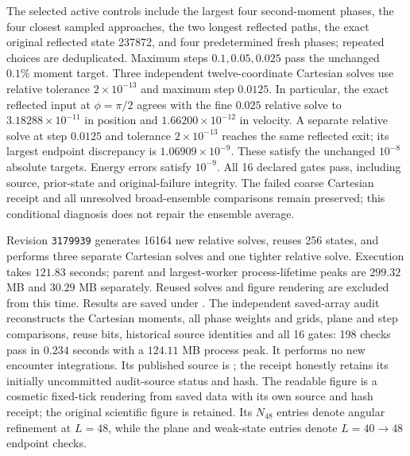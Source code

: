 \documentclass[11pt,letterpaper]{article}
\begin{document}
The selected active controls include the largest four second-moment
phases, the four closest sampled approaches, the two longest reflected
paths, the exact original reflected state 237872, and four predetermined
fresh phases; repeated choices are deduplicated. Maximum steps
$0.1,0.05,0.025$ pass the unchanged $0.1\%$ moment target.
Three independent twelve-coordinate Cartesian solves use relative
tolerance $2\times10^{-13}$ and maximum step $0.0125$. In particular,
the exact reflected input at $\phi=\pi/2$ agrees with the fine
$0.025$ relative solve to $3.18288\times10^{-11}$ in position and
$1.66200\times10^{-12}$ in velocity. A separate relative solve at
step $0.0125$ and tolerance $2\times10^{-13}$ reaches the same reflected
exit; its largest endpoint discrepancy is $1.06909\times10^{-9}$.
These satisfy the unchanged $10^{-8}$ absolute targets. Energy
errors satisfy $10^{-9}$. All 16 declared gates pass, including source,
prior-state and original-failure integrity. The failed coarse
Cartesian receipt and all unresolved broad-ensemble comparisons
remain preserved; this conditional diagnosis does not repair the
ensemble average.

Revision \texttt{3179939} generates 16164 new relative solves, reuses
256 states, and performs three separate Cartesian solves and one
tighter relative solve. Execution takes $121.83$ seconds; parent and
largest-worker process-lifetime peaks are $299.32$ MB and $30.29$ MB
separately. Reused solves and figure rendering are excluded from this
time. Results are saved under .
The independent saved-array audit reconstructs the Cartesian moments,
all phase weights and grids, plane and step comparisons, reuse bits,
historical source identities and all 16 gates: 198 checks pass in
$0.234$ seconds with a $124.11$ MB process peak. It performs no new
encounter integrations. Its published source is
;
the receipt honestly retains its initially uncommitted audit-source
status and hash. The readable figure is a cosmetic fixed-tick rendering
from saved data with its own source and hash receipt; the original
scientific figure is retained. Its $N_{48}$ entries denote angular
refinement at $L=48$, while the plane and weak-state entries denote
$L=40\to48$ endpoint checks.
\end{document}
